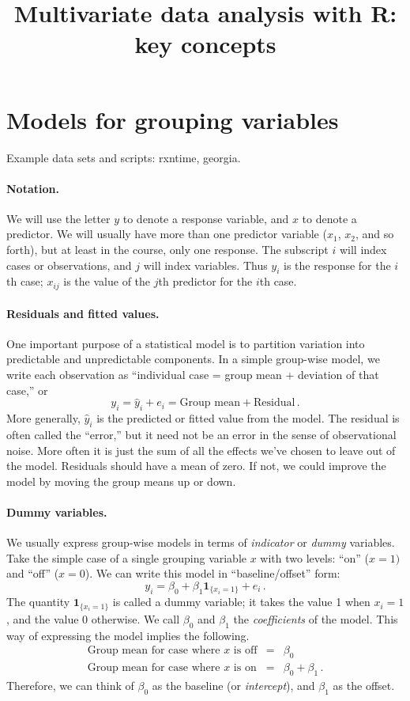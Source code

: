\documentclass[11pt]{article}
\title{Multivariate data analysis with R: key concepts}
\date{}  %
\newcommand{\1}[1]{\mathbf{1}_{\{ {#1} \}}}
\begin{document}

\maketitle%


\section{Models for grouping variables}
Example data sets and scripts: rxntime, georgia.

\paragraph{Notation.} We will use the letter $y$ to denote a response variable, and $x$ to denote a predictor.  We will usually have more than one predictor variable ($x_1$, $x_2$, and so forth), but at least in the course, only one response.  The subscript $i$ will index cases or observations, and $j$ will index variables.  Thus $y_i$ is the response for the $i$th case; $x_{ij}$ is the value of the $j$th predictor for the $i$th case.

\paragraph{Residuals and fitted values.}  One important purpose of a statistical model is to partition variation into predictable and unpredictable components.  In a simple group-wise model, we write each observation as ``individual case = group mean + deviation of that case,'' or
$$
y_i = \hat{y}_i + e_i = \mbox{Group mean} + \mbox{Residual} \, .
$$
More generally, $\hat{y}_i$ is the predicted or fitted value from the model.  The residual is often called the ``error,'' but it need not be an error in the sense of observational noise.  More often it is just the sum of all the effects we've chosen to leave out of the model.  Residuals should have a mean of zero.  If not, we could improve the model by moving the group means up or down.

\paragraph{Dummy variables.}  We usually express group-wise models in terms of \textit{indicator} or \textit{dummy} variables.  Take the simple case of a single grouping variable $x$ with two levels: ``on'' ($x=1)$ and ``off'' ($x=0$).  We can write this model in ``baseline/offset'' form:
$$
y_i = \beta_0 + \beta_1 \1{x_i=1} + e_i \, .
$$
The quantity $\1{x_i=1}$ is called a dummy variable; it takes the value 1 when $x_i=1$, and the value 0 otherwise.   We call $\beta_0$ and $\beta_1$ the \textit{coefficients} of the model.  This way of expressing the model implies the following.
\begin{eqnarray*}
\mbox{Group mean for case where $x$ is off} &=& \beta_0 \\
\mbox{Group mean for case where $x$ is on} &=& \beta_0 + \beta_1 \, .
\end{eqnarray*}
Therefore, we can think of $\beta_0$ as the baseline (or \textit{intercept}), and $\beta_1$ as the offset.
\end{document}
